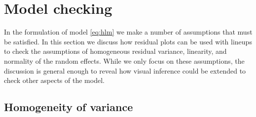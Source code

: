 \documentclass[12pt]{article} %
\begin{document}


\section{Model checking}\label{sec:checking}

In the formulation of model \eqref{eq:hlm} we make a number of assumptions that must be satisfied. In this section we discuss how residual plots can be used with lineups to check the assumptions of homogeneous residual variance, linearity, and normality of the random effects. While we only focus on these assumptions, the discussion is general enough to reveal how visual inference could be extended to check other aspects of the model.

%


\subsection{Homogeneity of variance}
\end{document}
